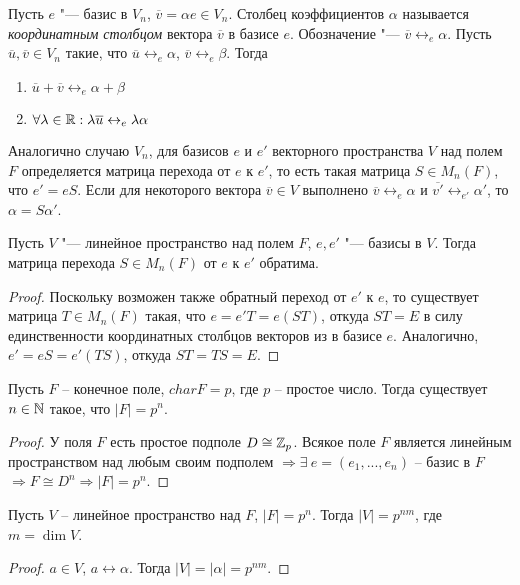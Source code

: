     \begin{reminder}
    	Пусть $e$ "--- базис в $V_n$, $\overline{v} = \alpha e \in V_n$. Столбец коэффициентов $\alpha$ называется \textit{координатным столбцом} вектора $\overline{v}$ в базисе $e$. Обозначение "--- $\overline{v} \leftrightarrow_e \alpha$. Пусть $\overline u, \overline v \in V_n$ такие, что $\overline u \leftrightarrow_e \alpha$, $\overline v \leftrightarrow_e \beta$. Тогда
            \begin{enumerate}
                \item $\overline u + \overline v \leftrightarrow_e \alpha + \beta$
                \item $\forall \lambda \in \mathbb{R}: \lambda \overline u \leftrightarrow_e \lambda\alpha$
            \end{enumerate}
    \end{reminder}
    
    \begin{note}
    	Аналогично случаю $V_n$, для базисов $e$ и $e'$ векторного пространства $V$ над полем $F$ определяется матрица перехода от $e$ к $e'$, то есть такая матрица $S \in M_n(F)$, что $e' = eS$. Если для некоторого вектора $\overline{v} \in V$ выполнено $\overline{v} \leftrightarrow_{e} \alpha$ и $\overline{v'} \leftrightarrow_{e'} \alpha'$, то $\alpha = S\alpha'$.
    \end{note}
    
    \begin{proposition}
    	Пусть $V$ "--- линейное пространство над полем $F$, $e, e'$ "--- базисы в $V$. Тогда матрица перехода $S \in M_n(F)$ от $e$ к $e'$ обратима.
    \end{proposition}
    
    \begin{proof}
    	Поскольку возможен также обратный переход от $e'$ к $e$, то существует матрица $T \in M_n(F)$ такая, что $e = e'T = e(ST)$, откуда $ST = E$ в силу единственности координатных столбцов векторов из в базисе $e$. Аналогично, $e' = eS = e'(TS)$, откуда $ST = TS = E$.
    \end{proof}

    \begin{theorem}
        Пусть $F$ -- конечное поле, $char F = p$, где $p$ -- простое число. Тогда существует $n \in \mathbb{N}$ такое, что $|F| = p^n$.
    \end{theorem}

    \begin{proof}
        У поля $F$ есть простое подполе $D \cong \mathbb{Z}_p$. Всякое поле $F$ является линейным пространством над любым своим подполем $\Rightarrow \exists  \ e = (e_{1}, ..., e_{n})$ -- базис в $F$ $\Rightarrow F \cong D^n \Rightarrow |F| = p^n$. 
    \end{proof}

    \begin{corollary}
        Пусть $V$ -- линейное пространство над $F$, $|F| = p^n$. Тогда $|V| = p^{nm}$, где $m = \dim V$.
    \end{corollary}

    \begin{proof}
        $a \in V$, $a \leftrightarrow \alpha$. Тогда $|V| = |\alpha| = p^{nm}$.
    \end{proof}